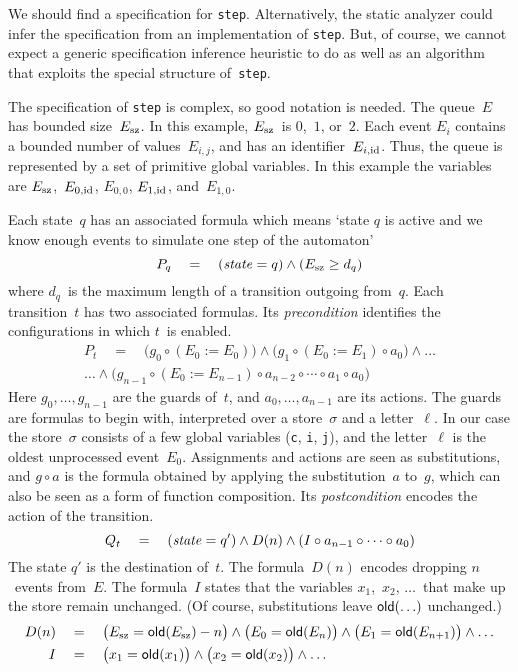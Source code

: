 \documentclass{article} %
\begin{document}
We should find a specification for {\tt step}.
Alternatively, the static analyzer could infer the specification from an implementation of {\tt step}.
But, of course, we cannot expect a generic specification inference heuristic to do as well as an algorithm that exploits the special structure of~{\tt step}.

The specification of {\tt step} is complex, so good notation is needed.
The queue~$E$ has bounded size~$E_{\rm sz}$.
In this example, $E_{\rm sz}$~is $0$,~$1$, or~$2$.
Each event $E_i$ contains a bounded number of values~$E_{i,j}$, and has an identifier~$E_{i,{\rm id}}$.
Thus, the queue is represented by a set of primitive global variables.
In this example the variables are $E_{\rm sz}$,~$E_{0,{\rm id}}$, $E_{0,0}$, $E_{1,{\rm id}}$, and~$E_{1,0}$.

Each state~$q$ has an associated formula which means `state $q$ is active and we know enough events to simulate one step of the automaton'
\[ P_q \quad=\quad ({\it state}=q) \land (E_{\rm sz}\ge d_q) \]
where $d_q$~is the maximum length of a transition outgoing from~$q$.
Each transition~$t$ has two associated formulas.
Its \emph{precondition} identifies the configurations in which $t$~is enabled.
\begin{multline*}
P_t \quad=\quad
    \bigl(g_0\circ(E_0:=E_0)\bigr)
    \land\bigl(g_1\circ(E_0:=E_1)\circ a_0\bigr)
    \land\ldots\\\ldots
    \land\bigl(g_{n-1}\circ (E_0:=E_{n-1})\circ a_{n-2} \circ\cdots\circ a_1\circ a_0\bigr)
\end{multline*}
Here $g_0,\ldots,g_{n-1}$ are the guards of~$t$, and $a_0,\ldots,a_{n-1}$ are its actions.
The guards are formulas to begin with, interpreted over a store~$\sigma$ and a letter~$\ell$.
In our case the store~$\sigma$ consists of a few global variables ({\tt c}, {\tt i}, {\tt j}), and the letter~$\ell$ is the oldest unprocessed event~$E_0$.
Assignments and actions are seen as substitutions, and $g\circ a$ is the formula obtained by applying the substitution~$a$ to~$g$, which can also be seen as a form of function composition.
Its \emph{postcondition} encodes the action of the transition.
\[ Q_t \quad=\quad
  ({\it state}=q')
  \land D(n)
  \land (I\circ a_{n-1}\circ\cdots\circ a_0)
  \]
The state $q'$ is the destination of~$t$.
The formula~$D(n)$ encodes dropping $n$~events from~$E$.
The formula~$I$ states that the variables $x_1$,~$x_2$, $\ldots$~that make up the store remain unchanged.
(Of course, substitutions leave ${\sf old}(\ldots)$ unchanged.)
\begin{align*}
D(n) \quad&=\quad
  \bigl(E_{\rm sz}={\sf old}(E_{\rm sz})-n\bigr)
  \land\bigl(E_0={\sf old}(E_n)\bigr)
  \land\bigl(E_1={\sf old}(E_{n+1})\bigr)
  \land\ldots\\
I \quad&=\quad
  \bigl(x_1={\sf old}(x_1)\bigr)
  \land\bigl(x_2={\sf old}(x_2)\bigr)
  \land\ldots
\end{align*}
\end{document}
